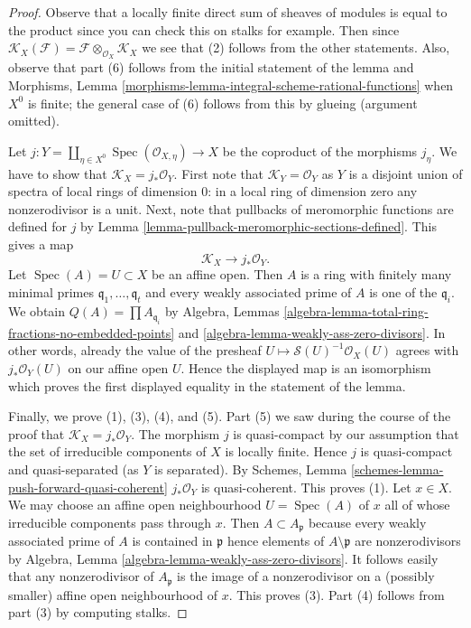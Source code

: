 \documentclass[10pt,a4paper]{amsart}
\theoremstyle{plain}
\theoremstyle{definition}
\theoremstyle{remark}
\numberwithin{equation}{subsection}
\def\Spec{\mathop{\mathrm{Spec}}}
\begin{document}
\begin{proof}
Observe that a locally finite direct sum of sheaves of modules
is equal to the product since you can check this on stalks for
example. Then since $\mathcal{K}_X(\mathcal{F}) =
\mathcal{F} \otimes_{\mathcal{O}_X} \mathcal{K}_X$
we see that (2) follows from the other statements.
Also, observe that part (6) follows from the initial
statement of the lemma and Morphisms, Lemma
\ref{morphisms-lemma-integral-scheme-rational-functions}
when $X^0$ is finite; the general case of (6) follows from this
by glueing (argument omitted).

\medskip\noindent
Let $j : Y = \coprod\nolimits_{\eta \in X^0} \Spec(\mathcal{O}_{X, \eta}) \to X$
be the coproduct of the morphisms $j_\eta$. We have to show that
$\mathcal{K}_X = j_*\mathcal{O}_Y$.
First note that $\mathcal{K}_Y = \mathcal{O}_Y$ as $Y$ is a disjoint
union of spectra of local rings of dimension $0$: in a local
ring of dimension zero any nonzerodivisor is a unit.
Next, note that pullbacks of meromorphic
functions are defined for $j$ by
Lemma \ref{lemma-pullback-meromorphic-sections-defined}.
This gives a map
$$
\mathcal{K}_X \longrightarrow j_*\mathcal{O}_Y.
$$
Let $\Spec(A) = U \subset X$ be an affine open. Then $A$ is a ring
with finitely many minimal primes $\mathfrak q_1, \ldots, \mathfrak q_t$
and every weakly associated prime of $A$ is one of the $\mathfrak q_i$.
We obtain $Q(A) = \prod A_{\mathfrak q_i}$
by Algebra, Lemmas \ref{algebra-lemma-total-ring-fractions-no-embedded-points}
and \ref{algebra-lemma-weakly-ass-zero-divisors}.
In other words, already the value of the presheaf
$U \mapsto \mathcal{S}(U)^{-1}\mathcal{O}_X(U)$ agrees with
$j_*\mathcal{O}_Y(U)$ on our affine open $U$. Hence the displayed
map is an isomorphism which proves the first displayed equality in
the statement of the lemma.

\medskip\noindent
Finally, we prove (1), (3), (4), and (5).
Part (5) we saw during the course of the proof that
$\mathcal{K}_X = j_*\mathcal{O}_Y$.
The morphism $j$ is quasi-compact by our assumption
that the set of irreducible components of $X$ is locally finite.
Hence $j$ is quasi-compact and quasi-separated (as $Y$ is separated).
By Schemes, Lemma \ref{schemes-lemma-push-forward-quasi-coherent}
$j_*\mathcal{O}_Y$ is quasi-coherent. This proves (1).
Let $x \in X$. We may choose an affine open neighbourhood
$U = \Spec(A)$ of $x$ all of whose irreducible components
pass through $x$. Then $A \subset A_\mathfrak p$ because every
weakly associated prime of $A$ is contained in $\mathfrak p$
hence elements of $A \setminus \mathfrak p$ are nonzerodivisors
by Algebra, Lemma \ref{algebra-lemma-weakly-ass-zero-divisors}.
It follows easily that any nonzerodivisor of $A_\mathfrak p$
is the image of a nonzerodivisor on a (possibly smaller)
affine open neighbourhood of $x$. This proves (3).
Part (4) follows from part (3) by computing stalks.
\end{proof}
\end{document}
